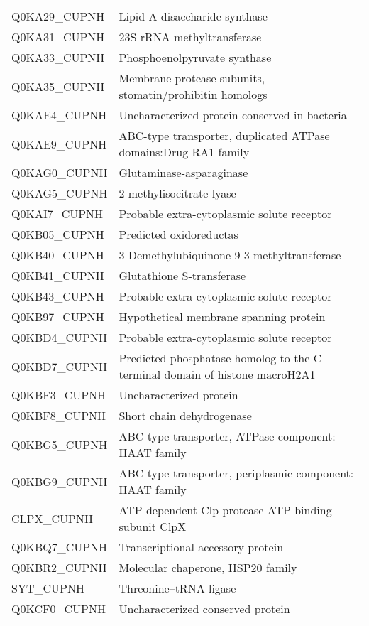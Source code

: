 \begin{center}
\begin{longtable}{ l l }
Q0KA29\_CUPNH & Lipid-A-disaccharide synthase \\ [0.5ex]
Q0KA31\_CUPNH & 23S rRNA methyltransferase \\ [0.5ex]
Q0KA33\_CUPNH & Phosphoenolpyruvate synthase \\ [0.5ex]
Q0KA35\_CUPNH & Membrane protease subunits, stomatin/prohibitin homologs \\ [0.5ex]
Q0KAE4\_CUPNH & Uncharacterized protein conserved in bacteria \\ [0.5ex]
Q0KAE9\_CUPNH & ABC-type transporter, duplicated ATPase domains:Drug RA1 family \\ [0.5ex]
Q0KAG0\_CUPNH & Glutaminase-asparaginase \\ [0.5ex]
Q0KAG5\_CUPNH & 2-methylisocitrate lyase \\ [0.5ex]
Q0KAI7\_CUPNH & Probable extra-cytoplasmic solute receptor \\ [0.5ex]
Q0KB05\_CUPNH & Predicted oxidoreductas \\ [0.5ex]
Q0KB40\_CUPNH & 3-Demethylubiquinone-9 3-methyltransferase \\ [0.5ex]
Q0KB41\_CUPNH & Glutathione S-transferase \\ [0.5ex]
Q0KB43\_CUPNH & Probable extra-cytoplasmic solute receptor \\ [0.5ex]
Q0KB97\_CUPNH & Hypothetical membrane spanning protein \\ [0.5ex]
Q0KBD4\_CUPNH & Probable extra-cytoplasmic solute receptor \\ [0.5ex]
Q0KBD7\_CUPNH & Predicted phosphatase homolog to the C-terminal domain of histone macroH2A1 \\ [0.5ex]
Q0KBF3\_CUPNH & Uncharacterized protein \\ [0.5ex]
Q0KBF8\_CUPNH & Short chain dehydrogenase \\ [0.5ex]
Q0KBG5\_CUPNH & ABC-type transporter, ATPase component: HAAT family \\ [0.5ex]
Q0KBG9\_CUPNH & ABC-type transporter, periplasmic component: HAAT family \\ [0.5ex]
CLPX\_CUPNH & ATP-dependent Clp protease ATP-binding subunit ClpX \\ [0.5ex]
Q0KBQ7\_CUPNH & Transcriptional accessory protein \\ [0.5ex]
Q0KBR2\_CUPNH & Molecular chaperone, HSP20 family \\ [0.5ex]
SYT\_CUPNH & Threonine--tRNA ligase \\ [0.5ex]
Q0KCF0\_CUPNH & Uncharacterized conserved protein \\ [0.5ex]

\end{longtable}
\end{center}
